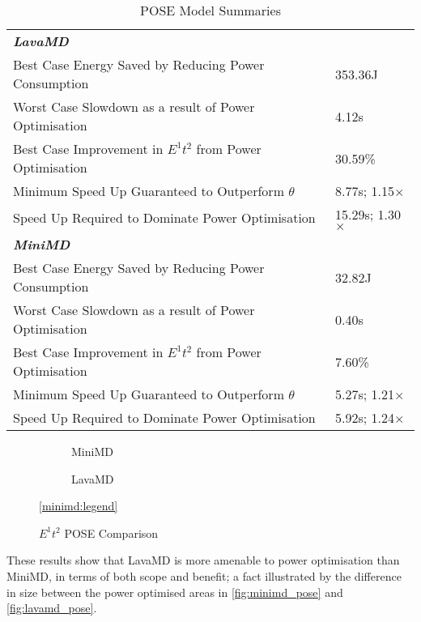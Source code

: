 \begin{table}[h!]
\caption{POSE Model Summaries}
\label{tab:summaries}
\begin{tabular}{@{}ll@{}}\toprule
 \textbf{\emph{LavaMD}}&\\
 Best Case Energy Saved by Reducing Power Consumption & 353.36J \\
 Worst Case Slowdown as a result of Power Optimisation & 4.12s \\
 Best Case Improvement in $E^1t^2$ from Power Optimisation & 30.59\% \\
 Minimum Speed Up Guaranteed to Outperform $\theta$ & 8.77s; 1.15$\times$ \\
 Speed Up Required to Dominate Power Optimisation & 15.29s; 1.30$\times$ \\
 \rule{0pt}{2.5ex}\textbf{\textit{MiniMD}}& \\
 Best Case Energy Saved by Reducing Power Consumption & 32.82J \\
 Worst Case Slowdown as a result of Power Optimisation & 0.40s \\
 Best Case Improvement in $E^1t^2$ from Power Optimisation & 7.60\% \\
 Minimum Speed Up Guaranteed to Outperform $\theta$ & 5.27s; 1.21$\times$ \\
 Speed Up Required to Dominate Power Optimisation & 5.92s; 1.24$\times$ \\
\bottomrule
\end{tabular}
\end{table}

\begin{figure*}[t]%
  \scriptsize
  \begin{subfigure}[t]{.5\linewidth}%
    \caption{MiniMD}%
    \label{fig:minimd_pose}
  \end{subfigure}%
  \begin{subfigure}[t]{.5\linewidth}%
    \caption{LavaMD}%
    \label{fig:lavamd_pose}
  \end{subfigure}%
  \begin{center}%
    \ref{minimd:legend}%
  \end{center}%
  \caption{$E^1t^2$ POSE Comparison}%
  \label{fig:comparison}%
\end{figure*}

These results show that LavaMD is more amenable to power optimisation than MiniMD, in terms of both scope and benefit; a fact illustrated by the difference in size between the power optimised areas in \autoref{fig:minimd_pose} and \autoref{fig:lavamd_pose}.

